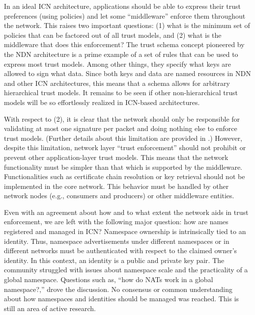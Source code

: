 In an ideal ICN architecture, applications should be able to express their trust preferences
(using policies) and let some ``middleware'' enforce them throughout the network. This raises
two important questions: (1) what is the minimum set of policies that can be factored out of
all trust models, and (2) what is the middleware that does this enforcement? The trust schema concept
pioneered by the NDN architecture \cite{schemas} is a prime example of a set of rules that can be
used to express most trust models. Among other things, they specify what keys are allowed to
sign what data. Since both keys and data are named resources in NDN and other ICN architectures,
this means that a schema allows for arbitrary hierarchical trust models. It remains to be seen
if other non-hierarchical trust models will be so effortlessly realized in ICN-based architectures.

With respect to (2), it is clear that the network should only be responsible for
validating at most one signature per packet and doing nothing else to enforce
trust models. (Further details about this limitation are provided in \cite{trust}.)
However, despite this limitation, network layer ``trust enforcement'' should not prohibit or prevent other
application-layer trust models. This means that the network functionality must be simpler than
that which is supported by the middleware. Functionalities such as certificate chain
resolution or key retrieval should not be implemented in the core network.
This behavior must be handled by other network nodes (e.g., consumers and producers)
or other middleware entities.

Even with an agreement about how and to what extent the network aids in trust
enforcement, we are left with the following major question: how are names registered and managed in ICN?
Namespace ownership is intrinsically tied to an identity. Thus, namespace advertisements under
different namespaces or in different networks must be authenticated with respect to the
claimed owner's identity. In this context, an identity is a public and private key pair.
The community struggled with issues about namespace scale and the practicality of a global
namespace. Questions such as, ``how do NATs work in a global namespace?,'' drove the
discussion. No consensus or common understanding about how namespaces and identities
should be managed was reached. This is still an area of active research.

